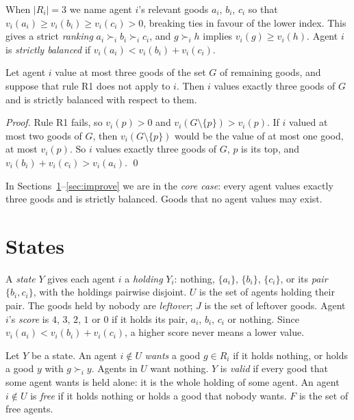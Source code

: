\documentclass[runningheads,11pt]{llncs}
\begin{document}
\noindent When $|R_i|=3$ we name agent $i$'s relevant goods $a_i$, $b_i$, $c_i$ so that $v_i(a_i)\ge v_i(b_i)\ge v_i(c_i)>0$, breaking ties in favour of the lower index. This gives a strict \emph{ranking} $a_i\succ_i b_i\succ_i c_i$, and $g\succ_i h$ implies $v_i(g)\ge v_i(h)$. Agent $i$ is \emph{strictly balanced} if $v_i(a_i)<v_i(b_i)+v_i(c_i)$.

\begin{lemma}\label{lem:R1fail}
Let agent $i$ value at most three goods of the set $G$ of remaining goods, and suppose that rule R1 does not apply to $i$. Then $i$ values exactly three goods of $G$ and is strictly balanced with respect to them.
\end{lemma}

\begin{proof}
Rule R1 fails, so $v_i(p)>0$ and $v_i(G\setminus\{p\})>v_i(p)$. If $i$ valued at most two goods of $G$, then $v_i(G\setminus\{p\})$ would be the value of at most one good, at most $v_i(p)$. So $i$ values exactly three goods of $G$, $p$ is its top, and $v_i(b_i)+v_i(c_i)>v_i(a_i)$. \qed
\end{proof}

\noindent In Sections~\ref{sec:states}--\ref{sec:improve} we are in the \emph{core case}: every agent values exactly three goods and is strictly balanced. Goods that no agent values may exist.

\section{States}\label{sec:states}

\begin{definition}\label{def:state}
A \emph{state} $Y$ gives each agent $i$ a \emph{holding} $Y_i$: nothing, $\{a_i\}$, $\{b_i\}$, $\{c_i\}$, or its \emph{pair} $\{b_i,c_i\}$, with the holdings pairwise disjoint. $U$ is the set of agents holding their pair. The goods held by nobody are \emph{leftover}; $J$ is the set of leftover goods. Agent $i$'s \emph{score} is $4$, $3$, $2$, $1$ or $0$ if it holds its pair, $a_i$, $b_i$, $c_i$ or nothing. Since $v_i(a_i)<v_i(b_i)+v_i(c_i)$, a higher score never means a lower value.
\end{definition}

\begin{definition}\label{def:valid}
Let $Y$ be a state. An agent $i\notin U$ \emph{wants} a good $g\in R_i$ if it holds nothing, or holds a good $y$ with $g\succ_i y$. Agents in $U$ want nothing. $Y$ is \emph{valid} if every good that some agent wants is held alone: it is the whole holding of some agent. An agent $i\notin U$ is \emph{free} if it holds nothing or holds a good that nobody wants. $F$ is the set of free agents.
\end{definition}
\end{document}
